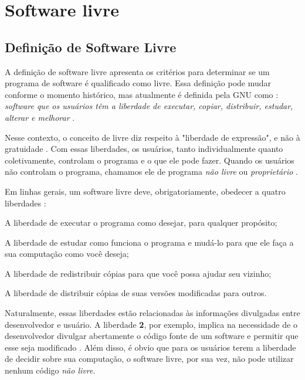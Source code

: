 


\chapter{Software livre}
\label{chap:SoftwareLivre}

\section{Definição de Software Livre}

A definição de software livre apresenta os critérios para determinar se um programa de software é qualificado como livre. Essa definição pode mudar conforme o momento histórico, mas atualmente é definida pela GNU como : \textit{software que os usuários têm a liberdade de executar, copiar, distribuir, estudar, alterar e melhorar} \cite{Inc2012} . 

Nesse contexto, o conceito de livre diz respeito à "liberdade de expressão", e não à gratuidade \cite{Williams}. Com essas liberdades, os usuários, tanto individualmente quanto coletivamente, controlam o programa e o que ele pode fazer. Quando os usuários não controlam o programa, chamamos ele de programa \textit{não livre} ou \textit{proprietário} \cite{Inc2012}. 

Em linhas gerais, um software livre deve, obrigatoriamente, obedecer a quatro liberdades \cite{Inc2012, Williams, Lessig2002} :
\begin{compactenum}
	\item A liberdade de executar o programa como desejar, para qualquer propósito;
	\item A liberdade de estudar como funciona o programa e mudá-lo para que ele faça a sua computação como você deseja;
	\item A liberdade de redistribuir cópias para que você possa ajudar seu vizinho;
	\item A liberdade de distribuir cópias de suas versões modificadas para outros.
\end{compactenum}

Naturalmente, essas liberdades estão relacionadas às informações divulgadas entre desenvolvedor e usuário. A liberdade \textbf{2}, por exemplo, implica na necessidade de o desenvolvedor divulgar abertamente o código fonte de um software e permitir que esse seja modificado \cite{Inc2012}. Além disso, é obvio que para os usuários terem a liberdade de decidir sobre sua computação, o software livre, por sua vez, não pode utilizar nenhum código \textit{não livre}.

